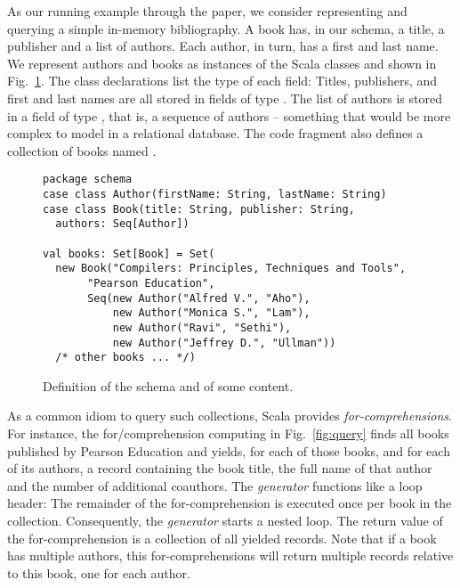 As our running example through the paper, we consider representing and querying a simple in-memory bibliography. A book has, in our schema, a title, a publisher and a list of authors. Each author, in turn, has a first and last name. We represent authors and books as instances of the Scala classes  and  shown in Fig.~\ref{fig:schema}. The class declarations list the type of each field: Titles, publishers, and first and last names are all stored in fields of type . The list of authors is stored in a field of type , that is, a sequence of authors -- something that would be more complex to model in a relational database.
The code fragment also defines a collection of books named .
\begin{figure}[t]
\centering
\begin{lstlisting}
package schema
case class Author(firstName: String, lastName: String)
case class Book(title: String, publisher: String,
  authors: Seq[Author])

val books: Set[Book] = Set(
  new Book("Compilers: Principles, Techniques and Tools",
       "Pearson Education",
       Seq(new Author("Alfred V.", "Aho"),
           new Author("Monica S.", "Lam"),
           new Author("Ravi", "Sethi"),
           new Author("Jeffrey D.", "Ullman"))
  /* other books ... */)
\end{lstlisting}
\caption{Definition of the schema and of some content.}
\label{fig:schema}
\end{figure}

As a common idiom to query such collections, Scala provides \emph{for-comprehensions}.
For instance, the for\-/comprehension computing  in Fig.~\ref{fig:query} finds all books published by Pearson Education and yields, for each of those books, and for each of its authors, a record containing the book title, the full name of that author and the number of additional coauthors.
The \emph{generator}  functions like a loop header: The remainder of the for-comprehension is executed once per book in the collection. Consequently, the \emph{generator}  starts a nested loop.
The return value of the for-comprehension is a collection of all yielded
records. Note that if a book has multiple authors, this for-comprehensions will
return multiple records relative to this book, one for each author.

